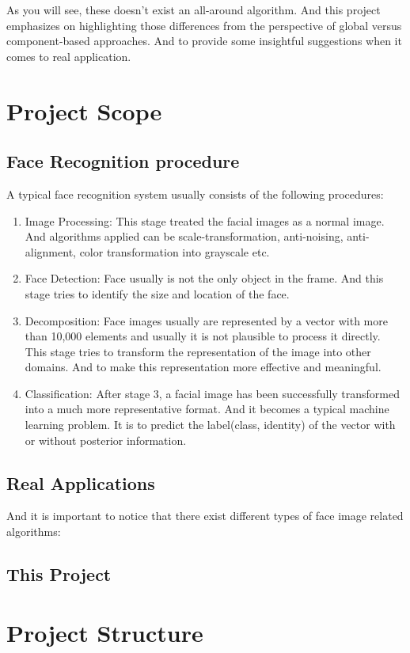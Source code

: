 As you will see, these doesn't exist an all-around algorithm. And this project emphasizes on highlighting those differences from the perspective of global versus component-based approaches. And to provide some insightful suggestions when it comes to real application.

\section{Project Scope}
\subsection{Face Recognition procedure}
A typical face recognition system usually consists of the following procedures:
\begin{enumerate}
    \item{Image Processing: } This stage treated the facial images as a normal image. And algorithms applied can be scale-transformation, anti-noising, anti-alignment, color transformation into grayscale etc.
    \item{Face Detection: } Face usually is not the only object in the frame. And this stage tries to identify the size and location of the face.
    \item{Decomposition: } Face images usually are represented by a vector with more than 10,000 elements and usually it is not plausible to process it directly. This stage tries to transform the representation of the image into other domains. And to make this representation more effective and meaningful.
    \item{Classification: } After stage 3, a facial image has been successfully transformed into a much more representative format. And it becomes a typical machine learning problem. It is to predict the label(class, identity) of the vector with or without posterior information.
\end{enumerate}
\subsection{Real Applications}
And it is important to notice that there exist different types of face image related algorithms:
\subsection{This Project}

\section{Project Structure}

